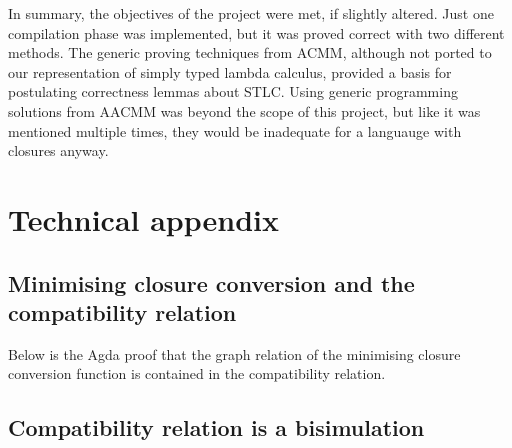 \documentclass[bsc,frontabs,oneside,singlespacing,parskip,deptreport]{infthesis}
\theoremstyle{definition}
\theoremstyle{lemma}
\begin{document}
In summary, the objectives of the project were met, if slightly
altered. Just one compilation phase was implemented, but it was proved
correct with two different methods. The generic proving techniques
from ACMM, although not ported to our representation of simply typed
lambda calculus, provided a basis for postulating correctness lemmas
about STLC. Using generic programming solutions from AACMM was beyond
the scope of this project, but like it was mentioned multiple times,
they would be inadequate for a languauge with closures anyway.

\chapter{Technical appendix}
\label{cha:technical-appendix}

\section{Minimising closure conversion and the compatibility relation}
\label{sec:minim-clos-conv-2}

Below is the Agda proof that the graph relation of the minimising
closure conversion function is contained in the compatibility relation.


\section{Compatibility relation is a bisimulation}
\label{sec:comp-relat-bisim-1}

\end{document}
